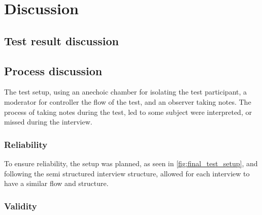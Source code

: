 \chapter{Discussion}

\section{Test result discussion}
     

\section{Process discussion}
    The test setup, using an anechoic chamber for isolating the test participant, a moderator for controller the flow of the test, and an observer taking notes. The process of taking notes during the test, led to some subject were interpreted, or missed during the interview.
    
    \subsection{Reliability}
        To ensure reliability, the setup was planned, as seen in \autoref{fig:final_test_setup}, and following the semi structured interview structure, allowed for each interview to have a similar flow and structure.
    \subsection{Validity}
        